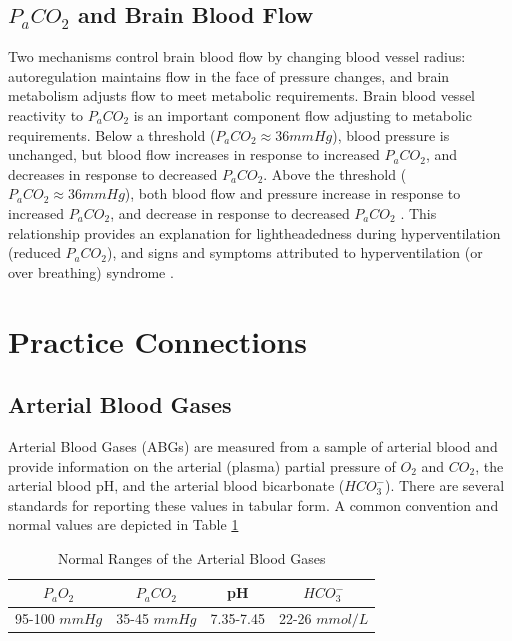 \subsection{$P_aCO_2$ and Brain Blood Flow}

Two mechanisms control brain blood flow by changing blood vessel radius: autoregulation maintains flow in the face of pressure changes, and brain metabolism adjusts flow to meet metabolic requirements. Brain blood vessel reactivity to $P_aCO_2$ is an important component flow adjusting to metabolic requirements. Below a threshold ($P_aCO_2 \approx 36 mmHg$), blood pressure is unchanged, but blood flow increases in response to increased $P_aCO_2$, and decreases in response to decreased $P_aCO_2$. Above the threshold ($P_aCO_2 \approx 36 mmHg$), both blood flow and pressure increase in response to increased $P_aCO_2$, and decrease in response to decreased $P_aCO_2$ \cite{battisti-charbonney_cerebrovascular_2011}. This relationship provides an explanation for lightheadedness during hyperventilation (reduced $P_aCO_2$), and signs and symptoms attributed to hyperventilation (or over breathing) syndrome \cite{courtney_investigating_2008}.

\section{Practice Connections}

\subsection{Arterial Blood Gases}

Arterial Blood Gases (ABGs) are measured from a sample of arterial blood and provide information on the arterial (plasma) partial pressure of $O_2$ and $CO_2$, the arterial blood pH, and the arterial blood bicarbonate ($HCO_3^-$). There are several standards for reporting these values in tabular form. A common convention and normal values are depicted in Table \ref{table:ABGs}

\begin{table}[h!]
\centering
\begin{tabular}{||c|c|c|c||} 
 \hline
 $P_aO_2$ & $P_aCO_2$ & pH & $HCO_3^-$ \\ [0.5ex] 
 \hline
 95-100 $mmHg$ & 35-45 $mmHg$ & 7.35-7.45 & 22-26 $mmol/L$ \\ [1ex] 
 \hline
\end{tabular}
\caption{Normal Ranges of the Arterial Blood Gases}
\label{table:ABGs}
\end{table}

